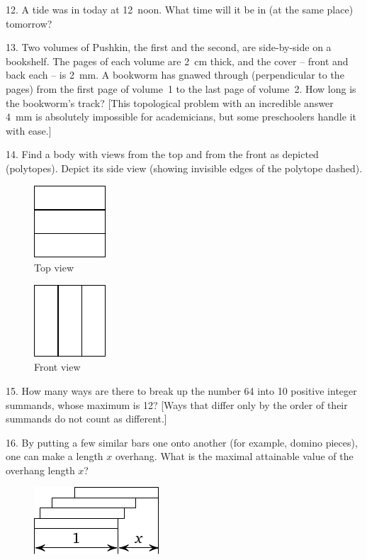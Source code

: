\begin{problem}{12.}
	A tide was in today at 12~noon. What time will it be in (at the same place) tomorrow?
\end{problem}

\begin{problem}{13.}
	Two volumes of Pushkin, the first and the second, are side-by-side on a bookshelf. The pages of each
	volume are \SI{2}{\cm} thick, and the cover -- front and back each -- is \SI{2}{\mm}. A bookworm has gnawed through
	(perpendicular to the pages) from the first page of volume~1 to the last page of volume~2. How long is the bookworm's track? [This topological problem with an incredible answer \SI{4}{\mm} is absolutely impossible for academicians,
	but some preschoolers handle it with ease.]
\end{problem}

\begin{problem}{14.}
	Find a body with views from the top and from the front as depicted (polytopes).
	Depict its side view (showing invisible edges of the polytope dashed).
	\begin{figure}
		\footnotesize
		\null\hfill
		\parbox{0.2\linewidth}{\centering\includegraphics{resources/taskbook-99}\\Top view}
		\hfill
		\parbox{0.2\linewidth}{\centering\includegraphics{resources/taskbook-98}\\Front view}
		\hfill\null
	\end{figure}
\end{problem}

\begin{problem}{15.}
	How many ways are there to break up the number 64 into 10 positive integer summands, whose maximum is 12? [Ways that differ only by the order of their summands do not count as different.]
\end{problem}

\begin{problem}{16.}
	By putting a few similar bars one onto another (for example, domino pieces),
	one can make a length $x$ overhang. What is the maximal attainable value of the overhang length $x$?
	\begin{figure}
		\includegraphics{resources/taskbook-97}
	\end{figure}
\end{problem}

